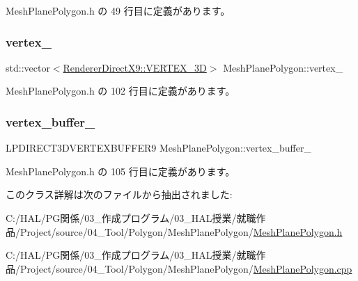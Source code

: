  Mesh\+Plane\+Polygon.\+h の 49 行目に定義があります。

\mbox{\label{class_mesh_plane_polygon_a9736e54f457231deee711a2310a0ee2a}} 
\subsubsection{\texorpdfstring{vertex\+\_\+}{vertex\_}}
{\footnotesize\ttfamily std\+::vector$<$\mbox{\hyperlink{class_renderer_direct_x9_1_1_v_e_r_t_e_x__3_d}{Renderer\+Direct\+X9\+::\+V\+E\+R\+T\+E\+X\+\_\+3D}}$>$ Mesh\+Plane\+Polygon\+::vertex\+\_\+\hspace{0.3cm}{\ttfamily [private]}}



 Mesh\+Plane\+Polygon.\+h の 102 行目に定義があります。

\mbox{\label{class_mesh_plane_polygon_a71ae2d4bea783da57a1b0ec4f6a53971}} 
\subsubsection{\texorpdfstring{vertex\+\_\+buffer\+\_\+}{vertex\_buffer\_}}
{\footnotesize\ttfamily L\+P\+D\+I\+R\+E\+C\+T3\+D\+V\+E\+R\+T\+E\+X\+B\+U\+F\+F\+E\+R9 Mesh\+Plane\+Polygon\+::vertex\+\_\+buffer\+\_\+\hspace{0.3cm}{\ttfamily [private]}}



 Mesh\+Plane\+Polygon.\+h の 105 行目に定義があります。



このクラス詳解は次のファイルから抽出されました\+:\begin{DoxyCompactItemize}
\item 
C\+:/\+H\+A\+L/\+P\+G関係/03\+\_\+作成プログラム/03\+\_\+\+H\+A\+L授業/就職作品/\+Project/source/04\+\_\+\+Tool/\+Polygon/\+Mesh\+Plane\+Polygon/\mbox{\hyperlink{_mesh_plane_polygon_8h}{Mesh\+Plane\+Polygon.\+h}}\item 
C\+:/\+H\+A\+L/\+P\+G関係/03\+\_\+作成プログラム/03\+\_\+\+H\+A\+L授業/就職作品/\+Project/source/04\+\_\+\+Tool/\+Polygon/\+Mesh\+Plane\+Polygon/\mbox{\hyperlink{_mesh_plane_polygon_8cpp}{Mesh\+Plane\+Polygon.\+cpp}}\end{DoxyCompactItemize}
